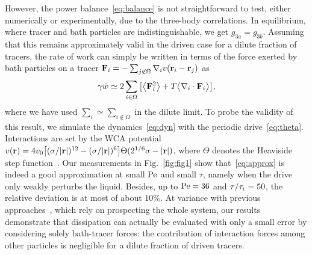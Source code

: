 \documentclass[superscriptaddress, twocolumn, prx, longbibliography, nofootinbib]{revtex4-1}
\begin{document}
However, the power balance~\eqref{eq:balance} is not straightforward to test, either numerically or experimentally, due to the three-body correlations. In equilibrium, where tracer and bath particles are indistinguishable, we get $g_{3a}=g_{3b}$. Assuming that this remains approximately valid in the driven case for a dilute fraction of tracers, the rate of work can simply be written in terms of the force exerted by bath particles on a tracer ${\bf F}_i =- \sum_{j\not\in\Omega}\nabla_iv({\bf r}_i-{\bf r}_j)$ as
\begin{equation}\label{eq:approx}
	\gamma\dot w \simeq 2\sum_{i\in\Omega} \big[ \big\langle{\bf F}_i^2\big\rangle + T \big\langle\nabla_i\cdot{\bf F}_i\big\rangle \big] ,
\end{equation}
where we have used $\sum_i\simeq\sum_{i\not\in\Omega}$ in the dilute limit. To probe the validity of this result, we simulate the dynamics~\eqref{eq:dyn} with the periodic drive~\eqref{eq:theta}. Interactions are set by the WCA potential $v({\bf r})=4v_0\big[(\sigma/|{\bf r}|)^{12}-(\sigma/|{\bf r}|)^6\big]\Theta(2^{1/6}\sigma-|{\bf r}|)$, where $\Theta$ denotes the Heaviside step function~\cite{WCA1971}. Our measurements in Fig.~\ref{fig:fig1} show that~\eqref{eq:approx} is indeed a good approximation at small $\rm Pe$ and small $\tau$, namely when the drive only weakly perturbs the liquid. Besides, up to ${\rm Pe}=36$ and $\tau/\tau_{\rm r}=50$, the relative deviation is at most of about $10\%$. At variance with previous approaches~\cite{Harada2005, Lander2012, Battle604}, which rely on prospecting the whole system, our results demonstrate that dissipation can actually be evaluated with only a small error by considering solely bath-tracer forces: the contribution of interaction forces among other particles is negligible for a dilute fraction of driven tracers.
\end{document}
